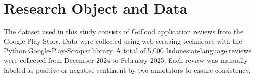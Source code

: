 \section{Research Object and Data}

The dataset used in this study consists of GoFood application reviews from the Google Play Store. Data were collected using web scraping techniques with the Python Google-Play-Scraper library. A total of 5,000 Indonesian-language reviews were collected from December 2024 to February 2025. Each review was manually labeled as positive or negative sentiment by two annotators to ensure consistency.
